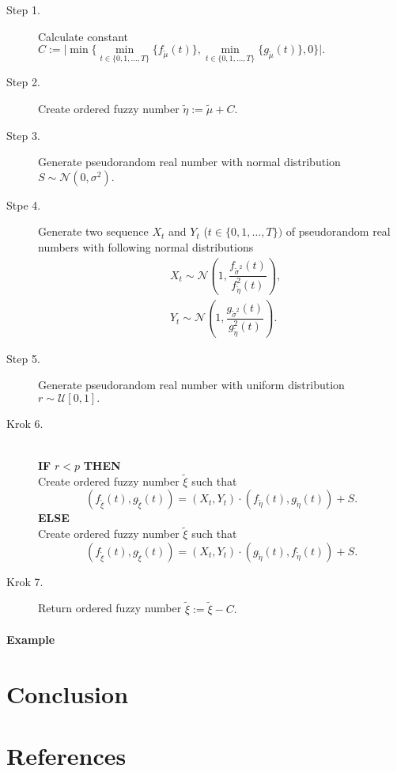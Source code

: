 \documentclass[review]{elsarticle}
\theoremstyle{definition}
\theoremstyle{theorem}
\begin{document}
\begin{algorithm}
  \begin{description}
\item[Step 1.] Calculate constant $C:= \big|\min\{\min\limits_{t\in\{0,1,\ldots,T\}}\{f_{\tilde{\mu}}(t)\},\min\limits_{t\in\{0,1,\ldots,T\}}\{g_{\tilde{\mu}}(t)\},0\}\big|.$
\item[Step 2.] Create ordered fuzzy number $\tilde{\eta}:=\tilde{\mu}+C.$
\item[Step 3.] Generate pseudorandom real number with normal distribution $S\sim\mathcal{N}\left(0,\sigma^2\right).$
\item[Stpe 4.] Generate two sequence $X_t$ and $Y_t$ ($t\in\{0,1,\ldots,T\})$ of pseudorandom real numbers with following normal distributions
\begin{align}
&X_t\sim\mathcal{N}\left(1,\dfrac{f_{\tilde{\sigma}^2}(t)}{f_{\tilde{\eta}}^2(t)}\right),\nonumber\\
&Y_t\sim\mathcal{N}\left(1,\dfrac{g_{\tilde{\sigma}^2}(t)}{g_{\tilde{\eta}}^2(t)}\right).\nonumber
\end{align}
\item[Step 5.] Generate pseudorandom real number with uniform distribution $r\sim \mathcal{U}[0,1].$
\item[Krok 6.] \indent \\{\bf IF} $r<p$ {\bf THEN}\\ \indent  Create ordered fuzzy number $\tilde{\xi}$ such that
$$(f_{\tilde{\xi}}(t), g_{\tilde{\xi}}(t)) = (X_t, Y_t)\cdot(f_{\tilde{\eta}}(t),g_{\tilde{\eta}}(t))+S.$$
{\bf ELSE} \indent \\ \indent Create ordered fuzzy number $\tilde{\xi}$ such that
$$(f_{\tilde{\xi}}(t), g_{\tilde{\xi}}(t)) = (X_t, Y_t)\cdot(g_{\tilde{\eta}}(t),f_{\tilde{\eta}}(t))+S.$$
\item[Krok 7.] Return ordered fuzzy number $\tilde{\xi}:= \tilde{\xi} - C.$
\end{description}
\caption{}
\label{algo:1}
\end{algorithm}

\paragraph{Example} 

\section{Conclusion}

\section*{References}


\end{document}
